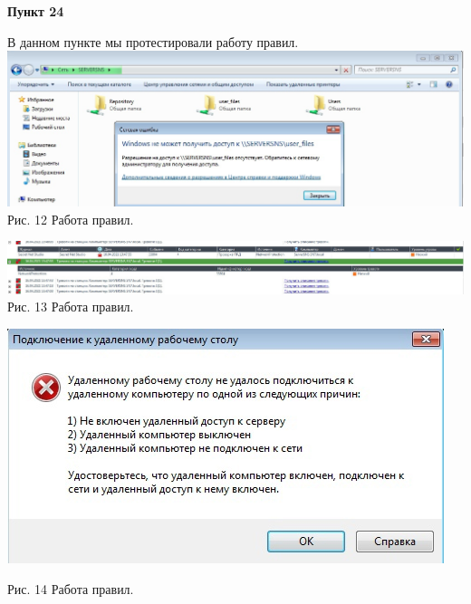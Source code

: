 \documentclass[a4paper,14pt]{extarticle}
\begin{document}
    \newpage
    \textbf{Пункт 24}
    \begin{center}
        В данном пункте мы протестировали работу правил.
        \includegraphics[scale=0.35]{pics/24_1.jpg}\\

        Рис. 12 Работа правил.

        \includegraphics[scale=0.25]{pics/24_2.jpg}\\

        Рис. 13 Работа правил.

        \includegraphics[scale=0.6]{pics/24_3.jpg}

        Рис. 14 Работа правил.
    \end{center}
\end{document}
